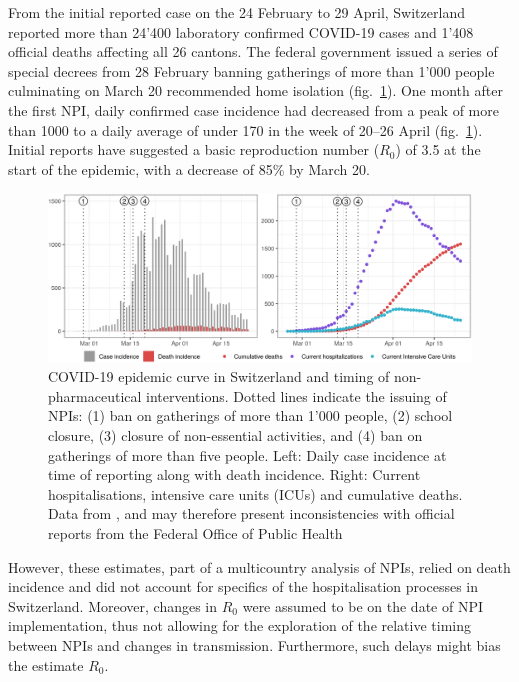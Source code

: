 From the initial reported case on the 24 February to 29 April, Switzerland reported more than 24'400 laboratory confirmed COVID-19 cases and 1'408 official deaths affecting all 26 cantons\cite{OFSP:RapportSituationEpidemiologique:2020}. The federal government issued a series of special decrees from 28 February banning gatherings of more than 1'000 people culminating on March 20 recommended home isolation (fig.~\ref{fig:covid-ch-data}). One month after the first NPI, daily confirmed case incidence had decreased from a peak of more than 1000 to a daily average of under 170 in the week of 20–26 April (fig.~\ref{fig:covid-ch-data}). Initial reports have suggested a basic reproduction number ($R_0$) of 3.5 at the start of the epidemic, with a decrease of 85\% by March 20\cite[-3\baselineskip]{Flaxman:Report13Estimating:2020}.
\begin{figure}\centering
  \includegraphics[width=\textwidth]{fig_covid-switzerland-npi/FIGURE_1.png}
  \caption[COVID-19 epidemic curve in Switzerland and timing of interventions.]{COVID-19 epidemic curve in Switzerland and timing of non-pharmaceutical interventions. Dotted lines indicate the issuing of NPIs: (1) ban on gatherings of more than 1'000 people, (2) school closure, (3) closure of non-essential activities, and (4) ban on gatherings of more than five people. Left: Daily case incidence at time of reporting along with death incidence. Right: Current hospitalisations, intensive care units (ICUs) and cumulative deaths. Data from \textcite{Probst:DaenuprobstCovid19casesswitzerland:2020}, and may therefore present inconsistencies with official reports from the Federal Office of Public Health%
  }
  \label{fig:covid-ch-data}
\end{figure}
 However, these estimates, part of a multicountry analysis of NPIs, relied on death incidence and did not account for specifics of the hospitalisation processes in Switzerland. Moreover, changes in $R_0$ were assumed to be on the date of NPI implementation, thus not allowing for the exploration of the relative timing between NPIs and changes in transmission. Furthermore, such delays might bias the estimate $R_0$. 

